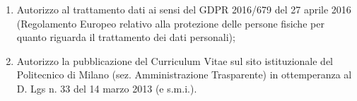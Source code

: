 \documentclass{resume}
\begin{document}
\ifshowauth
{}
\begin{enumerate}
   \item Autorizzo al trattamento dati ai sensi del GDPR 2016/679 del 27 aprile 2016
      (Regolamento Europeo relativo alla protezione delle persone fisiche per quanto
      riguarda il trattamento dei dati personali);
   \item Autorizzo la pubblicazione del Curriculum Vitae sul sito istituzionale del
      Politecnico di Milano (sez. Amministrazione Trasparente) in ottemperanza al D. Lgs
      n. 33 del 14 marzo 2013 (e s.m.i.).
\end{enumerate}
\else
\fi
\end{document}
